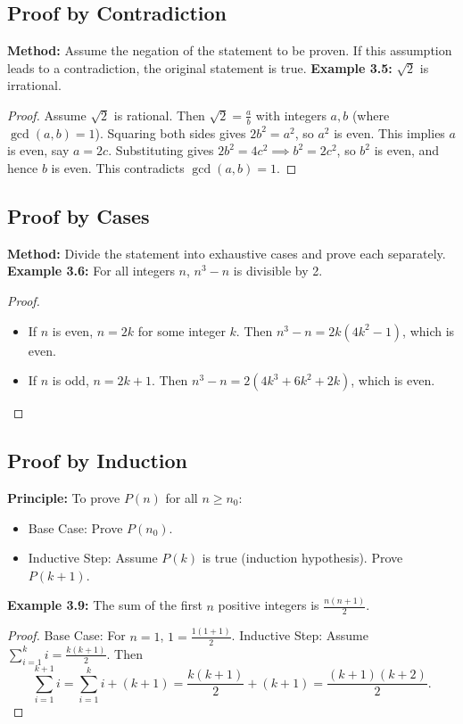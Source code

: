 \subsection*{Proof by Contradiction}
\textbf{Method:} Assume the negation of the statement to be proven. If this assumption leads to a contradiction, the original statement is true.
\textbf{Example 3.5:} $\sqrt{2}$ is irrational.
\begin{proof}
Assume $\sqrt{2}$ is rational. Then $\sqrt{2} = \frac{a}{b}$ with integers $a, b$ (where $\gcd(a, b) = 1$). Squaring both sides gives $2b^2 = a^2$, so $a^2$ is even. This implies $a$ is even, say $a = 2c$. Substituting gives $2b^2 = 4c^2 \implies b^2 = 2c^2$, so $b^2$ is even, and hence $b$ is even. This contradicts $\gcd(a, b) = 1$.
\end{proof}

\subsection*{Proof by Cases}
\textbf{Method:} Divide the statement into exhaustive cases and prove each separately.
\textbf{Example 3.6:} For all integers $n$, $n^3 - n$ is divisible by 2.
\begin{proof}
\begin{itemize}
    \item If $n$ is even, $n = 2k$ for some integer $k$. Then $n^3 - n = 2k(4k^2 - 1)$, which is even.
    \item If $n$ is odd, $n = 2k + 1$. Then $n^3 - n = 2(4k^3 + 6k^2 + 2k)$, which is even.
\end{itemize}
\end{proof}

\subsection*{Proof by Induction}
\textbf{Principle:} To prove $P(n)$ for all $n \geq n_0$:
\begin{itemize}
    \item Base Case: Prove $P(n_0)$.
    \item Inductive Step: Assume $P(k)$ is true (induction hypothesis). Prove $P(k + 1)$.
\end{itemize}
\textbf{Example 3.9:} The sum of the first $n$ positive integers is $\frac{n(n+1)}{2}$.
\begin{proof}
Base Case: For $n = 1$, $1 = \frac{1(1+1)}{2}$.
Inductive Step: Assume $\sum_{i=1}^k i = \frac{k(k+1)}{2}$. Then
\[ \sum_{i=1}^{k+1} i = \sum_{i=1}^k i + (k+1) = \frac{k(k+1)}{2} + (k+1) = \frac{(k+1)(k+2)}{2}. \]
\end{proof}
